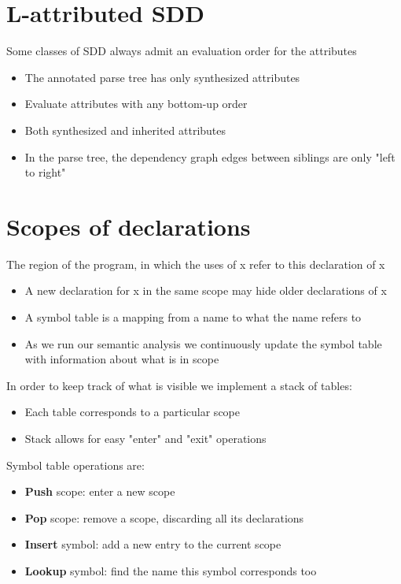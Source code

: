 \documentclass{article}[18pt]
\begin{document}
\section{L-attributed SDD}
Some classes of SDD always admit an evaluation order for the attributes
\begin{definition}
\begin{itemize}
	\item The annotated parse tree has only synthesized attributes
	\item Evaluate attributes with any bottom-up order
\end{itemize}
\end{definition}
\begin{definition}
\begin{itemize}
	\item Both synthesized and inherited attributes
	\item In the parse tree, the dependency graph edges between siblings are only "left to right"
\end{itemize}
\end{definition}
\section{Scopes of declarations}
\begin{definition}
The region of the program, in which the uses of x refer to this declaration of x
\end{definition}
\begin{itemize}
	\item A new declaration for x in the same scope may hide older declarations of x
	\item A symbol table is a mapping from a name to what the name refers to
	\item As we run our semantic analysis we continuously update the symbol table with information about what is in scope
\end{itemize}
In order to keep track of what is visible we implement a stack of tables:
\begin{itemize}
	\item Each table corresponds to a particular scope
	\item Stack allows for easy "enter" and "exit" operations
\end{itemize}
Symbol table operations are:
\begin{itemize}
	\item \textbf{Push} scope: enter a new scope
	\item \textbf{Pop} scope: remove a scope, discarding all its declarations
	\item \textbf{Insert} symbol: add a new entry to the current scope
	\item \textbf{Lookup} symbol: find the name this symbol corresponds too
\end{itemize}
\end{document}
